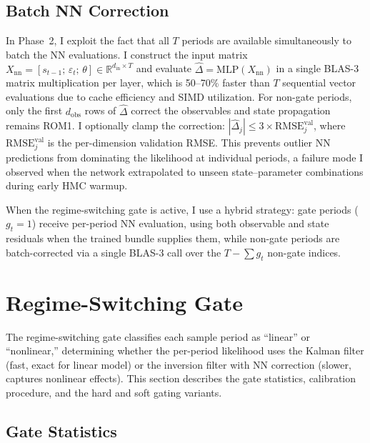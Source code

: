 \documentclass[12pt]{article}
\theoremstyle{plain}
\theoremstyle{definition}
\theoremstyle{remark}
\newcommand{\R}{\mathbb{R}}
\begin{document}
\subsection{Batch NN Correction}
\label{app:batch_nn}

In Phase~2, I exploit the fact that all $T$ periods are available simultaneously to batch the NN evaluations. I construct the input matrix $X_{\text{nn}} = [s_{t-1};\, \varepsilon_t;\, \theta] \in \R^{d_{\text{in}} \times T}$ and evaluate $\hat{\Delta} = \text{MLP}(X_{\text{nn}})$ in a single BLAS-3 matrix multiplication per layer, which is 50--70\% faster than $T$ sequential vector evaluations due to cache efficiency and SIMD utilization. For non-gate periods, only the first $d_{\text{obs}}$ rows of $\hat{\Delta}$ correct the observables and state propagation remains ROM1. I optionally clamp the correction: $|\hat{\Delta}_j| \leq 3 \times \text{RMSE}_j^{\text{val}}$, where $\text{RMSE}_j^{\text{val}}$ is the per-dimension validation RMSE. This prevents outlier NN predictions from dominating the likelihood at individual periods, a failure mode I observed when the network extrapolated to unseen state--parameter combinations during early HMC warmup.

When the regime-switching gate is active, I use a hybrid strategy: gate periods ($g_t = 1$) receive per-period NN evaluation, using both observable and state residuals when the trained bundle supplies them, while non-gate periods are batch-corrected via a single BLAS-3 call over the $T - \sum g_t$ non-gate indices.


\section{Regime-Switching Gate}
\label{app:gate}

The regime-switching gate classifies each sample period as ``linear'' or ``nonlinear,'' determining whether the per-period likelihood uses the Kalman filter (fast, exact for linear model) or the inversion filter with NN correction (slower, captures nonlinear effects). This section describes the gate statistics, calibration procedure, and the hard and soft gating variants.


\subsection{Gate Statistics}
\end{document}
